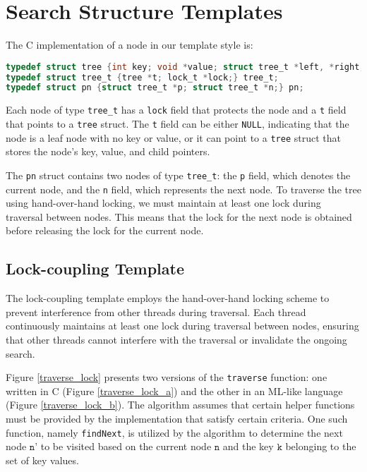 \documentclass[a4paper,UKenglish,cleveref, autoref, thm-restate]{lipics-v2021}
\begin{document}
\section{Search Structure Templates}
The C implementation of a node in our template style is:
\begin{lstlisting}[language = C, backgroundcolor=\color{white},   
	commentstyle=\color{codegreen},
	basicstyle=\ttfamily\footnotesize,
	breakatwhitespace=false,  breaklines=true,  keepspaces=true,                                
	showspaces=false,  showstringspaces=false,
	showtabs=false, tabsize=1]
typedef struct tree {int key; void *value; struct tree_t *left, *right;} tree;
typedef struct tree_t {tree *t; lock_t *lock;} tree_t;
typedef struct pn {struct tree_t *p; struct tree_t *n;} pn;
\end{lstlisting}
Each node of type \lstinline{tree_t} has a \lstinline{lock} field that protects the node and a \lstinline{t} field that points to a \lstinline{tree} struct. The \lstinline{t} field can be either \lstinline{NULL}, indicating that the node is a leaf node with no key or value, or it can point to a \lstinline{tree} struct that stores the node's key, value, and child pointers.

The \lstinline{pn} struct contains two nodes of type \lstinline{tree_t}: the \lstinline{p} field, which denotes the current node, and the \lstinline{n} field, which represents the next node. To traverse the tree using hand-over-hand locking, we must maintain at least one lock during traversal between nodes. This means that the lock for the next node is obtained before releasing the lock for the current node.

\subsection{Lock-coupling Template}
The lock-coupling template employs the hand-over-hand locking scheme to prevent interference from other threads during traversal. Each thread continuously maintains at least one lock during traversal between nodes, ensuring that other threads cannot interfere with the traversal or invalidate the ongoing search.

Figure \ref{traverse_lock} presents two versions of the \lstinline{traverse} function: one written in C (Figure \ref{traverse_lock_a}) and the other in an ML-like language (Figure \ref{traverse_lock_b}). The algorithm assumes that certain helper functions must be provided by the implementation that satisfy certain criteria. One such function, namely \lstinline{findNext}, is utilized by the algorithm to determine the next node $\texttt{n'}$ to be visited based on the current node $\texttt{n}$ and the key $\texttt{k}$ belonging to the set of key values.
\end{document}
